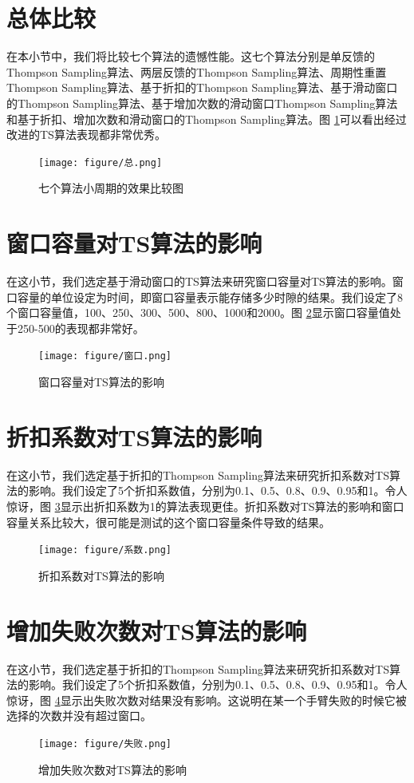 \section{总体比较}
在本小节中，我们将比较七个算法的遗憾性能。这七个算法分别是单反馈的Thompson Sampling算法、两层反馈的Thompson Sampling算法、周期性重置Thompson Sampling算法、基于折扣的Thompson Sampling算法、基于滑动窗口的Thompson Sampling算法、基于增加次数的滑动窗口Thompson Sampling算法和基于折扣、增加次数和滑动窗口的Thompson Sampling算法。图 \ref{fig总}可以看出经过改进的TS算法表现都非常优秀。
\begin{figure}[h]
	\centering
	\texttt{[image: figure/总.png]}
	\caption{七个算法小周期的效果比较图} 
	\label{fig总}
\end{figure}


\section{窗口容量对TS算法的影响}
在这小节，我们选定基于滑动窗口的TS算法来研究窗口容量对TS算法的影响。窗口容量的单位设定为时间，即窗口容量表示能存储多少时隙的结果。我们设定了8个窗口容量值，100、250、300、500、800、1000和2000。图 \ref{fig窗口}显示窗口容量值处于250-500的表现都非常好。
\begin{figure}[h]
	\centering
	\texttt{[image: figure/窗口.png]}
	\caption{窗口容量对TS算法的影响}
	\label{fig窗口}
\end{figure}

\section{折扣系数对TS算法的影响}
在这小节，我们选定基于折扣的Thompson Sampling算法来研究折扣系数对TS算法的影响。我们设定了5个折扣系数值，分别为0.1、0.5、0.8、0.9、0.95和1。令人惊讶，图 \ref{fig系数}显示出折扣系数为1的算法表现更佳。折扣系数对TS算法的影响和窗口容量关系比较大，很可能是测试的这个窗口容量条件导致的结果。
\begin{figure}[h]
	\centering
	\texttt{[image: figure/系数.png]}
	\caption{折扣系数对TS算法的影响}
	\label{fig系数}
\end{figure}

\section{增加失败次数对TS算法的影响}
在这小节，我们选定基于折扣的Thompson Sampling算法来研究折扣系数对TS算法的影响。我们设定了5个折扣系数值，分别为0.1、0.5、0.8、0.9、0.95和1。令人惊讶，图 \ref{fig失败}显示出失败次数对结果没有影响。这说明在某一个手臂失败的时候它被选择的次数并没有超过窗口。
\begin{figure}[h]
	\centering
	\texttt{[image: figure/失败.png]}
	\caption{增加失败次数对TS算法的影响}
	\label{fig失败}
\end{figure}

